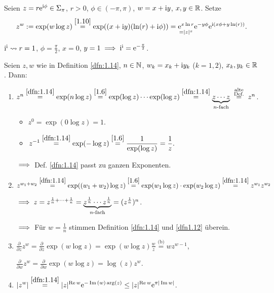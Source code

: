 \documentclass[a4paper,twoside,DIV15,BCOR12mm]{scrbook}
\begin{document}
\begin{dfn}\label{dfn:1.14}
Seien $z=r\mathrm{e}^{\mathrm{i}\phi}\in\Sigma_\pi$, $r>0$, $\phi\in(-\pi,\pi)$, $w = x+\mathrm{i} y$, $x,y\in\mathbb{R}$. Setze
\[z^w := \exp(w\log z)\stackrel{\eqref{1.10}}{=}\exp((x+\mathrm{i} y)(\ln(r)+\mathrm{i}\phi)) = \underset{=|z|^x}{\mathrm{e}^{x\ln r}} \mathrm{e}^{-y\phi}\mathrm{e}^{\mathrm{i}(x\phi + y\ln(r))}.\]
\end{dfn}

\begin{bsp*}
$\mathrm{i}^{\mathrm{i}} \leadsto r = 1$, $\phi = \frac{\pi}{2}$, $x =0$, $y=1 \implies \mathrm{i}^{\mathrm{i}} = \mathrm{e}^{-\frac{\pi}{2}}$.
\end{bsp*}

\begin{bem}\label{bem:1.15}
Seien $z,w$ wie in Definition \ref{dfn:1.14}, $n\in\mathbb{N}$, $w_k=x_k+\mathrm{i} y_k$ ($k=1,2$), $x_k,y_k\in\mathbb{R}$. Dann:
\begin{enumerate}
\item $z^n \stackrel{\ref{dfn:1.14}}{=} \exp (n \log z) \stackrel{\eqref{1.6}}{=} \exp(\log z)\dotsm\exp(\log z) \stackrel{\ref{dfn:1.14}}{=} \underbrace{z\dotsm z}_{n\text{-fach}} \wegen{=}{\substack{\text{alte}\\\text{Def.}}} z^n$.
\begin{itemize}
\item $z^0 = \exp(0\log z) = 1$.
\item $\displaystyle z^{-1} \stackrel{\ref{dfn:1.14}}{=} \exp(-\log z) \stackrel{\eqref{1.6}}{=}\frac{1}{\exp(\log z)} = \frac{1}{z}.$
\end{itemize}
$\implies$ Def. \ref{dfn:1.14} passt zu ganzen Exponenten.

\item $z^{w_1+w_2} \stackrel{\ref{dfn:1.14}}{=} \exp((w_1+w_2)\log z) \stackrel{\eqref{1.6}}{=}\exp(w_1\log z)\cdot\exp(w_2\log z) \stackrel{\ref{dfn:1.14}}{=}z^{w_1}z^{w_2}$

$\implies z = z^{\frac{1}{n} + \dotsm + \frac{1}{n}} = \underbrace{z^{\frac{1}{n}}\dotsm z^{\frac{1}{n}}}_{n\text{-fach}} = (z^{\frac{1}{n}})^n$.

$\implies$ Für $w=\frac{1}{n}$ stimmen Definition \ref{dfn:1.14} und \ref{dfn1.12} überein.

\item $\displaystyle \frac{\partial}{\partial z}z^w = \frac{\partial}{\partial z}\exp(w \log z) = \exp(w\log z)\frac{w}{z} \stackrel{\text{(b)}}{=}wz^{w-1}$,

$\displaystyle\frac{\partial}{\partial w} z^w = \frac{\partial}{\partial w} \exp (w\log z) = \log (z) z^w$.

\item $\displaystyle |z^w| \stackrel{\ref{dfn:1.14}}{=} |z|^{\operatorname{Re}{w}}\mathrm{e}^{-\operatorname{Im}{(w)}\arg(z)} \leq |z|^{\operatorname{Re}{w}}\mathrm{e}^{\pi|\operatorname{Im}{w}|}$.
\end{enumerate}
\end{bem}
\end{document}
